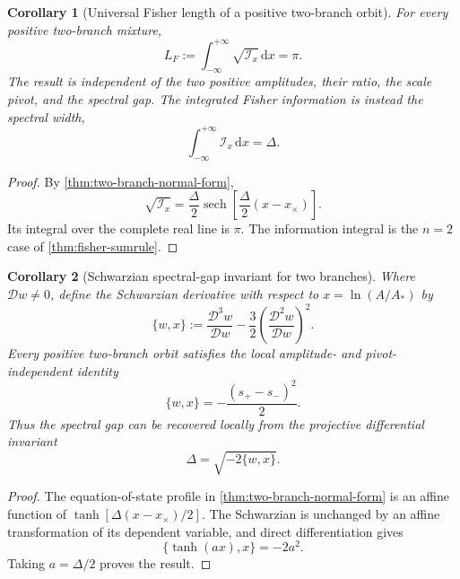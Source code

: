 \documentclass[aps,prd,preprint,onecolumn,nofootinbib,superscriptaddress,showkeys]{revtex4-2}
\numberwithin{equation}{section}
\theoremstyle{definition}
\theoremstyle{plain}
\newtheorem{corollary}{Corollary}[section]
\newcommand{\dd}{\mathrm d}
\newcommand{\Dil}{\mathscr D}
\begin{document}
\begin{corollary}[Universal Fisher length of a positive two-branch orbit]\label{cor:fisher-pi}
For every positive two-branch mixture,
\begin{equation}
\boxed{
L_F:=\int_{-\infty}^{+\infty}\sqrt{\mathcal I_x}\,\dd x=\pi.
}
\end{equation}
The result is independent of the two positive amplitudes, their ratio, the scale pivot, and the spectral gap.  The integrated Fisher information is instead the spectral width,
\begin{equation}
\int_{-\infty}^{+\infty}\mathcal I_x\,\dd x=\Delta.
\end{equation}
\end{corollary}

\begin{proof}
By \cref{thm:two-branch-normal-form},
\[
\sqrt{\mathcal I_x}
=\frac{\Delta}{2}\operatorname{sech}\!\left[\frac{\Delta}{2}(x-x_\times)\right].
\]
Its integral over the complete real line is $\pi$.  The information integral is the $n=2$ case of \cref{thm:fisher-sumrule}.
\end{proof}

\begin{corollary}[Schwarzian spectral-gap invariant for two branches]\label{cor:schwarzian-gap}
Where $\Dil w\ne0$, define the Schwarzian derivative with respect to $x=\ln(A/A_*)$ by
\begin{equation}
\{w,x\}:=
\frac{\Dil^3w}{\Dil w}
-\frac32\left(\frac{\Dil^2w}{\Dil w}\right)^2.
\end{equation}
Every positive two-branch orbit satisfies the local amplitude- and pivot-independent identity
\begin{equation}
\boxed{
\{w,x\}=-\frac{(s_+-s_-)^2}{2}.
}
\end{equation}
Thus the spectral gap can be recovered locally from the projective differential invariant
\begin{equation}
\boxed{
\Delta=\sqrt{-2\{w,x\}}.
}
\end{equation}
\end{corollary}

\begin{proof}
The equation-of-state profile in \cref{thm:two-branch-normal-form} is an affine function of $\tanh[\Delta(x-x_\times)/2]$.  The Schwarzian is unchanged by an affine transformation of its dependent variable, and direct differentiation gives
\[
\{\tanh(ax),x\}=-2a^2.
\]
Taking $a=\Delta/2$ proves the result.
\end{proof}
\end{document}

